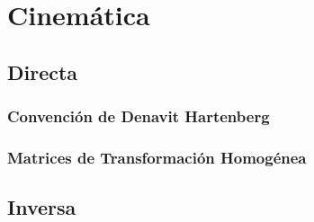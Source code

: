 \chapter{Cinemática}

\section{Directa}

\subsection{Convención de Denavit Hartenberg}

\subsection{Matrices de Transformación Homogénea}

\section{Inversa}
